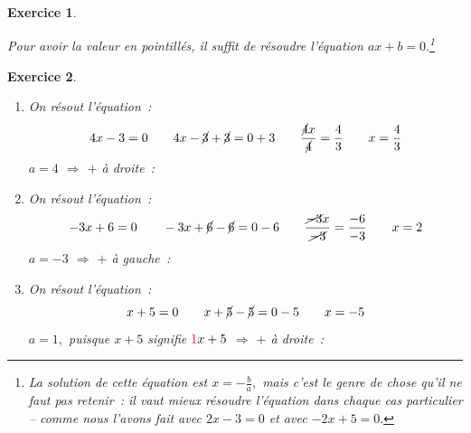 \documentclass[10pt]{article}
\newtheorem{exo}{Exercice}
\begin{document}
\begin{exo}
\begin{enumerate}
\begin{multicols}{2}
\end{multicols}

Pour avoir la valeur en pointillés, il suffit de résoudre l'équation $ax+b=0.$\footnote{La solution de cette équation est $x=-\frac{b}{a},$ mais c'est le genre de chose qu'il ne faut pas retenir~: il vaut mieux résoudre l'équation dans chaque cas particulier -- comme nous l'avons fait avec $2x-3=0$ et avec $-2x+5=0.$}


\end{enumerate}



\end{exo}

\begin{exo}

\begin{enumerate}
\item On résout l'équation~:
\[4x-3=0\qquad 4x-\cancel{3}+\cancel{3}=0+3\qquad \frac{\cancel{4}x}{\cancel{4}}=\frac{4}{3}\qquad x=\frac{4}{3}\]
$a=4$ $\Rightarrow$ $+$ à droite~:

\medskip
\begin{center}
\end{center}

\item 

On résout l'équation~:
\[-3x+6=0\qquad -3x+\cancel{6}-\cancel{6}=0-6\qquad \frac{\cancel{-3}x}{\cancel{-3}}=\frac{-6}{-3}\qquad x=2\]
$a=-3$ $\Rightarrow$ $+$ à gauche~:

\medskip
\begin{center}
\end{center}

\item On résout l'équation~:
\[x+5=0\qquad x+\cancel{5}-\cancel{5}=0-5\qquad x=-5\]
\danger $a=1,$ puisque $x+5$ signifie $\textcolor{red}{1}x+5$ $\Rightarrow$ $+$ à droite~:

\medskip
\begin{center}
\end{center}


\end{enumerate}
\end{exo}
\end{document}
